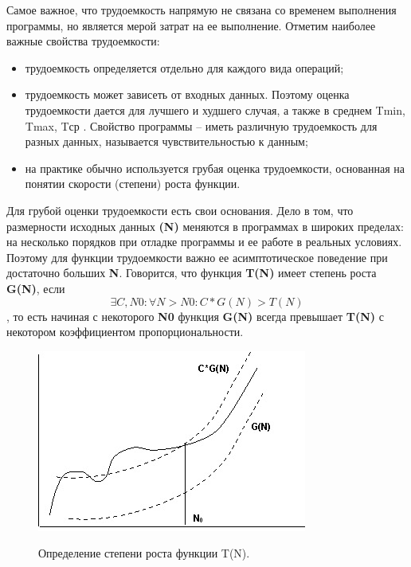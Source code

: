 \documentclass[12pt]{report}
\begin{document}
	Самое важное, что трудоемкость напрямую не связана со временем выполнения программы, но является мерой затрат на ее выполнение. Отметим наиболее важные свойства трудоемкости:
	\begin{itemize}
		\item трудоемкость определяется отдельно для каждого вида операций;
		\item трудоемкость может зависеть от входных данных. Поэтому оценка трудоемкости дается для лучшего и худшего случая, а также в среднем Tmin, Tmax, Tср . Свойство программы – иметь различную трудоемкость для разных данных, называется чувствительностью к данным;
		\item на практике обычно используется грубая оценка трудоемкости, основанная на понятии скорости (степени) роста функции.
	\end{itemize}
	
	Для грубой оценки трудоемкости есть свои основания. Дело в том, что размерности исходных данных \textbf{(N)} меняются в программах в широких пределах: на несколько порядков при отладке программы и ее работе в реальных условиях. Поэтому для функции трудоемкости важно ее асимптотическое поведение при достаточно больших \textbf{N}. Говорится, что функция  \textbf{T(N)} имеет степень роста  \textbf{G(N)}, если 
	 \begin{equation} \label{eq0}
	\exists C,N0 : \forall N>N0: C*G(N) > T(N)
	\end{equation}
	, то есть начиная с некоторого  \textbf{N0} функция  \textbf{G(N)} всегда превышает  \textbf{T(N)} с некотором коэффициентом пропорциональности.
	
	\begin{figure}[h!]
		\centering
		{\includegraphics[width=1\linewidth]{1}}
		\caption{Определение степени роста функции T(N).}
		\label{ris:image1}
	\end{figure}
	
\end{document}

